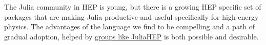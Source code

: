 \documentclass{webofc}
\begin{document}
The Julia community in HEP is young, but there is a growing HEP specific set of
packages that are making Julia productive and useful specifically for
high-energy physics. The advantages of the language we find to be compelling and
a path of gradual adoption, helped by
\href{https://hepsoftwarefoundation.org/activities/juliahep.html}{groups like
JuliaHEP} is both possible and desirable.

\sloppy
\raggedright

\end{document}

